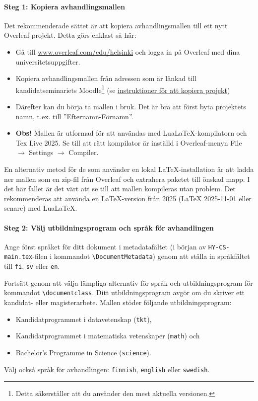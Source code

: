 \documentclass[swedish, manual, a4paper]{csthesis}
\begin{document}
\paragraph{Steg 1: Kopiera avhandlingsmallen}
Det rekommenderade sättet är att kopiera avhandlingsmallen till ett nytt Overleaf-projekt. Detta görs enklast så här:
\begin{itemize}
    \item Gå till \href{https://www.overleaf.com/edu/helsinki}{www.overleaf.com/edu/helsinki} och logga in på Overleaf med dina universitetsuppgifter.
    \item
    Kopiera avhandlingsmallen från adressen som är länkad till kandidatseminariets Moodle\footnote{Detta säkerställer att du använder den mest aktuella versionen.}
    (se \href{https://docs.overleaf.com/managing-projects-and-files/copying-a-project}{instruktioner för att kopiera projekt})
    \item Därefter kan du börja ta mallen i bruk. Det är bra att först byta projektets namn, t.ex. till ”Efternamn-Förnamn”.
    \item {\bf Obs!} Mallen är utformad för att användas med LuaLaTeX-kompilatorn och Tex Live 2025. Se till att rätt kompilator är inställd i Overleaf-menyn File $\rightarrow$ Settings $\rightarrow$ Compiler.
\end{itemize}
En alternativ metod för de som använder en lokal \LaTeX-installation är att ladda ner mallen som en zip-fil från Overleaf och extrahera paketet till önskad mapp. I det här fallet är det värt att se till att mallen kompileras utan problem. Det rekommenderas att använda en LaTeX-version från 2025 (LaTeX 2025-11-01 eller senare) med LuaLaTeX.


\paragraph{Steg 2: Välj utbildningsprogram och språk för avhandlingen}
Ange först språket för ditt dokument i metadatafältet (i början av \texttt{HY-CS-main.tex}-filen i kommandot \texttt{\textbackslash DocumentMetadata}) genom att ställa in språkfältet till \texttt{fi}, \texttt{sv} eller \texttt{en}.

Fortsätt genom att välja lämpliga alternativ för språk och utbildningsprogram för kommandot \texttt{\textbackslash documentclass}.
Ditt utbildningsprogram avgör om du skriver ett kandidat- eller magisterarbete.
Mallen stöder följande utbildningsprogram:
\begin{itemize}
\item Kandidatprogrammet i datavetenskap (\texttt{tkt}),
\item Kandidatprogrammet i matematiska vetenskaper (\texttt{math}) och
\item Bachelor's Programme in Science (\texttt{science}).
\end{itemize}
Välj också språk för avhandlingen: \texttt{finnish}, \texttt{english} eller \texttt{swedish}.
\end{document}
